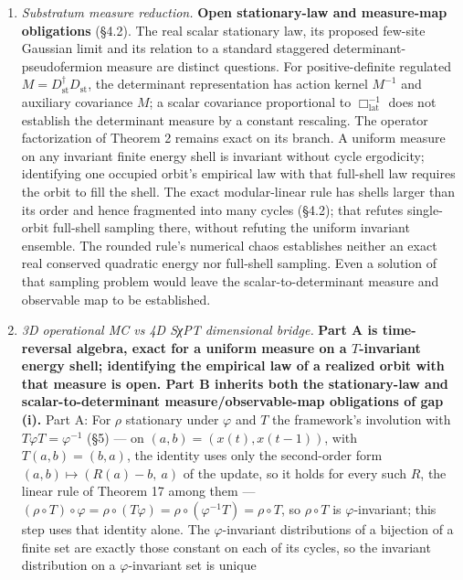 \documentclass[
]{article}
\begin{document}
\begin{enumerate}
\def\labelenumi{(\roman{enumi})}
\item
  \emph{Substratum measure reduction.} \textbf{Open stationary-law and
  measure-map obligations} (§4.2). The real scalar stationary law, its
  proposed few-site Gaussian limit and its relation to a standard
  staggered determinant-pseudofermion measure are distinct questions.
  For positive-definite regulated
  \(M=D_{\mathrm{st}}^\dagger D_{\mathrm{st}}\), the determinant
  representation has action kernel \(M^{-1}\) and auxiliary covariance
  \(M\); a scalar covariance proportional to
  \(\Box_{\mathrm{lat}}^{-1}\) does not establish the determinant
  measure by a constant rescaling. The operator factorization of Theorem
  2 remains exact on its branch. A uniform measure on any invariant
  finite energy shell is invariant without cycle ergodicity; identifying
  one occupied orbit's empirical law with that full-shell law requires
  the orbit to fill the shell. The exact modular-linear rule has shells
  larger than its order and hence fragmented into many cycles (§4.2);
  that refutes single-orbit full-shell sampling there, without refuting
  the uniform invariant ensemble. The rounded rule's numerical chaos
  establishes neither an exact real conserved quadratic energy nor
  full-shell sampling. Even a solution of that sampling problem would
  leave the scalar-to-determinant measure and observable map to be
  established.
\item
  \emph{3D operational MC vs 4D SχPT dimensional bridge.} \textbf{Part A
  is time-reversal algebra, exact for a uniform measure on a
  \(T\)-invariant energy shell; identifying the empirical law of a
  realized orbit with that measure is open. Part B inherits both the
  stationary-law and scalar-to-determinant measure/observable-map
  obligations of gap (i).} Part A: For \(\rho\) stationary under
  \(\varphi\) and \(T\) the framework's involution with
  \(T\varphi T = \varphi^{-1}\) (§5) --- on \((a, b) = (x(t), x(t-1))\),
  with \(T(a, b) = (b, a)\), the identity uses only the second-order
  form \((a, b) \mapsto (R(a) - b,\ a)\) of the update, so it holds for
  every such \(R\), the linear rule of Theorem 17 among them ---
  \((\rho \circ T) \circ \varphi = \rho \circ (T\varphi) = \rho \circ (\varphi^{-1}T) = \rho \circ T\),
  so \(\rho \circ T\) is \(\varphi\)-invariant; this step uses that
  identity alone. The \(\varphi\)-invariant distributions of a bijection
  of a finite set are exactly those constant on each of its cycles, so
  the invariant distribution on a \(\varphi\)-invariant set is unique

\end{enumerate}
\end{document}
